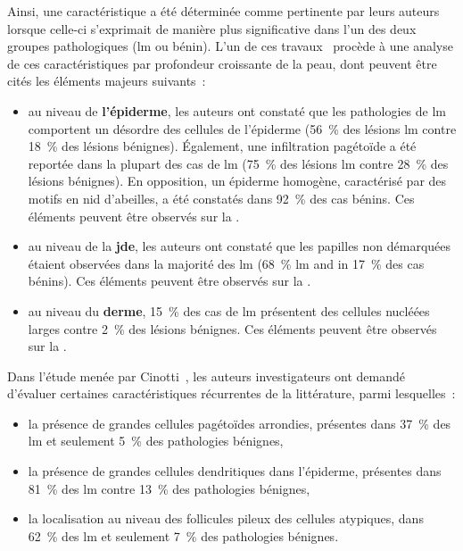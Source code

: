 Ainsi, une caractéristique a été déterminée comme pertinente par leurs auteurs lorsque celle-ci s'exprimait de manière plus significative dans l'un des deux groupes pathologiques (\gls{lm} ou bénin). L'un de ces travaux~\cite{Guitera2010} procède à une analyse de ces caractéristiques par profondeur croissante de la peau, dont peuvent être cités les éléments majeurs suivants~:
\begin{itemize}
    \item au niveau de \textbf{l'épiderme}, les auteurs ont constaté que les pathologies de \gls{lm} comportent un désordre des cellules de l'épiderme (56~\% des lésions \gls{lm} contre 18~\% des lésions bénignes). Également, une infiltration pagétoïde a été reportée dans la plupart des cas de \gls{lm} (75~\% des lésions \gls{lm} contre 28~\% des lésions bénignes). En opposition, un épiderme homogène, caractérisé par des motifs en nid d'abeilles, a été constatés dans 92~\% des cas bénins. Ces éléments peuvent être observés sur la .
    \item au niveau de la \textbf{\gls{jde}}, les auteurs ont constaté que les papilles non démarquées étaient observées dans la majorité des \gls{lm} (68~\% \gls{lm} and in 17~\% des cas bénins). Ces éléments peuvent être observés sur la .
    \item au niveau du \textbf{derme}, 15~\% des cas de \gls{lm} présentent des cellules nucléées larges contre 2~\% des lésions bénignes. Ces éléments peuvent être observés sur la .
\end{itemize}\par

Dans l'étude menée par Cinotti~, les auteurs investigateurs ont demandé d'évaluer certaines caractéristiques récurrentes de la littérature, parmi lesquelles~:
\begin{itemize}
    \item la présence de grandes cellules pagétoïdes arrondies, présentes dans 37~\% des \gls{lm} et seulement 5~\% des pathologies bénignes,
    \item la présence de grandes cellules dendritiques dans l'épiderme, présentes dans 81~\% des \gls{lm} contre 13~\% des pathologies bénignes,
    \item la localisation au niveau des follicules pileux des cellules atypiques, dans 62~\% des \gls{lm} et seulement 7~\% des pathologies bénignes.
\end{itemize}\par

